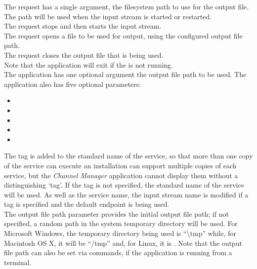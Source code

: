 The  request has a single argument,
the file\longDash{}system path to use for the output file.
The path will be used when the input stream is started or restarted.\\

The  request stops and then
starts the input stream.\\

The  request opens a file to be
used for output, using the configured output file path.\\

The  request closes the output
file that is being used.\\

Note that the application will exit if the
 is not running.\\

The application has one optional argument \longDash{} the output file path to be used.
The application also has five optional parameters:
\begin{itemize}
\item{}
\item\exSp{}
\item\exSp{}
\item\exSp{}
\item\exSp{}
\end{itemize}
The tag is added to the standard name of the service, so that more than one copy of the
service can execute \longDash{} an \mplusm{} installation can support multiple copies of
each  service, but the \emph{Channel Manager} application cannot display
them without a distinguishing `tag'.
If the tag is not specified, the standard name of the service will be used.
As well as the service name, the input stream name is modified if a tag is specified and
the default endpoint is being used.\\

The output file path parameter provides the initial output file path; if not specified, a
random path in the system temporary directory will be used.
For Microsoft Windows, the temporary directory being used is ``\textbackslash{}tmp''
while, for Macintosh OS X, it will be ``/tmp'' and, for Linux, it is \TBD.
Note that the output file path can also be set via commands, if the application is
running from a terminal.\\

